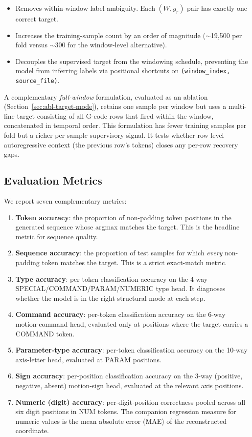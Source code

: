 \documentclass[sensors,article,submit,moreauthors,pdftex]{Definitions/mdpi}
\begin{document}
\begin{itemize}
\item Removes within-window label ambiguity. Each $(W, g_r)$ pair has exactly one correct target.
\item Increases the training-sample count by an order of magnitude ($\sim$19{,}500 per fold versus $\sim$300 for the window-level alternative).
\item Decouples the supervised target from the windowing schedule, preventing the model from inferring labels via positional shortcuts on \texttt{(window\_index, source\_file)}.
\end{itemize}

A complementary \emph{full-window} formulation, evaluated as an ablation (Section~\ref{sec:abl-target-mode}), retains one sample per window but uses a multi-line target consisting of all G-code rows that fired within the window, concatenated in temporal order. This formulation has fewer training samples per fold but a richer per-sample supervisory signal. It tests whether row-level autoregressive context (the previous row's tokens) closes any per-row recovery gaps.

\subsection{Evaluation Metrics}
\label{sec:metrics}

We report seven complementary metrics:

\begin{enumerate}
\item \textbf{Token accuracy}: the proportion of non-padding token positions in the generated sequence whose argmax matches the target. This is the headline metric for sequence quality.
\item \textbf{Sequence accuracy}: the proportion of test samples for which \emph{every} non-padding token matches the target. This is a strict exact-match metric.
\item \textbf{Type accuracy}: per-token classification accuracy on the 4-way SPECIAL/COMMAND/PARAM/NUMERIC type head. It diagnoses whether the model is in the right structural mode at each step.
\item \textbf{Command accuracy}: per-token classification accuracy on the 6-way motion-command head, evaluated only at positions where the target carries a COMMAND token.
\item \textbf{Parameter-type accuracy}: per-token classification accuracy on the 10-way axis-letter head, evaluated at PARAM positions.
\item \textbf{Sign accuracy}: per-position classification accuracy on the 3-way (positive, negative, absent) motion-sign head, evaluated at the relevant axis positions.
\item \textbf{Numeric (digit) accuracy}: per-digit-position correctness pooled across all six digit positions in NUM tokens. The companion regression measure for numeric values is the mean absolute error (MAE) of the reconstructed coordinate.
\end{enumerate}
\end{document}
